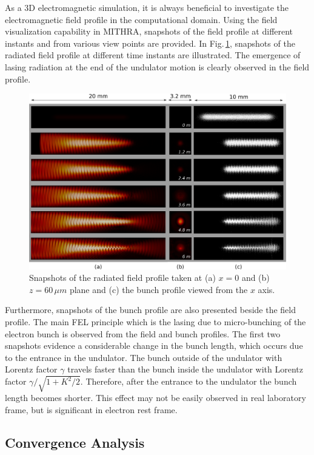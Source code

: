 As a 3D electromagnetic simulation, it is always beneficial to investigate the electromagnetic field profile in the computational domain.
%
Using the field visualization capability in MITHRA, snapshots of the field profile at different instants and from various view points are provided.
%
In Fig.\,\ref{profile-example1}, snapshots of the radiated field profile at different time instants are illustrated.
%
The emergence of lasing radiation at the end of the undulator motion is clearly observed in the field profile.
%
\begin{figure}
\centering
\includegraphics[width=6.0in]{./MITHRA_EXAMPLES/Fig2/Fig2.pdf}
\caption{Snapshots of the radiated field profile taken at (a) $x=0$ and (b) $z=60\,\mu m$ plane and (c) the bunch profile viewed from the $x$ axis.}
\label{profile-example1}
\end{figure}
%
Furthermore, snapshots of the bunch profile are also presented beside the field profile.
%
The main FEL principle which is the lasing due to micro-bunching of the electron bunch is observed from the field and bunch profiles.
%
The first two snapshots evidence a considerable change in the bunch length, which occurs due to the entrance in the undulator.
%
The bunch outside of the undulator with Lorentz factor $\gamma$ travels faster than the bunch inside the undulator with Lorentz factor $\gamma/\sqrt{1+K^2/2}$.
%
Therefore, after the entrance to the undulator the bunch length becomes shorter.
%
This effect may not be easily observed in real laboratory frame, but is significant in electron rest frame.

\subsection{Convergence Analysis}

